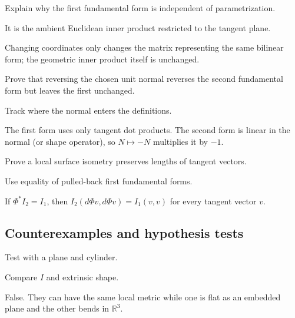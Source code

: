 \begin{exercise}\label{exr:vii15-ped-07}
Explain why the first fundamental form is independent of parametrization.
\end{exercise}
\begin{hint}
It is the ambient Euclidean inner product restricted to the tangent plane.
\end{hint}
\begin{solution}
Changing coordinates only changes the matrix representing the same bilinear form; the geometric inner product itself is unchanged.
\end{solution}

\begin{exercise}\label{exr:vii15-ped-08}
Prove that reversing the chosen unit normal reverses the second fundamental form but leaves the first unchanged.
\end{exercise}
\begin{hint}
Track where the normal enters the definitions.
\end{hint}
\begin{solution}
The first form uses only tangent dot products.  The second form is linear in the normal (or shape operator), so \(N\mapsto-N\) multiplies it by \(-1\).
\end{solution}

\begin{exercise}\label{exr:vii15-ped-09}
Prove a local surface isometry preserves lengths of tangent vectors.
\end{exercise}
\begin{hint}
Use equality of pulled-back first fundamental forms.
\end{hint}
\begin{solution}
If \(\Phi^*I_2=I_1\), then \(I_2(d\Phi v,d\Phi v)=I_1(v,v)\) for every tangent vector \(v\).
\end{solution}

\subsection*{Counterexamples and hypothesis tests}

\begin{exercise}\label{exr:vii15-ped-10}
Test with a plane and cylinder.
\end{exercise}
\begin{hint}
Compare \(I\) and extrinsic shape.
\end{hint}
\begin{solution}
False.  They can have the same local metric while one is flat as an embedded plane and the other bends in \(\mathbb R^3\).
\end{solution}

